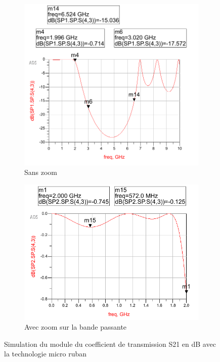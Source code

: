 \documentclass[french]{article}
\begin{document}
\begin{figure}[H]
	\centering
	\begin{subfigure}[b]{0.49\textwidth}
		\includegraphics[width=\textwidth]{photo/passe_bas_vic/simu_passe_bas_distribue.PNG}
		\caption{Sans zoom}
		\label{fig:simu_passe_bas_distribueG}
	\end{subfigure}
	\begin{subfigure}[b]{0.49\textwidth}
		\includegraphics[width=\textwidth]{photo/passe_bas_vic/simu_zoom_passe_bas_distribue.PNG}
		\caption{Avec zoom sur la bande passante}
		\label{fig:simu_zoom_passe_bas_distribue}
	\end{subfigure}
	\caption{Simulation du module du coefficient de transmission S21 en dB avec la technologie micro ruban}
	\label{fig:simu_passe_bas_distribue}
\end{figure}
\end{document}

